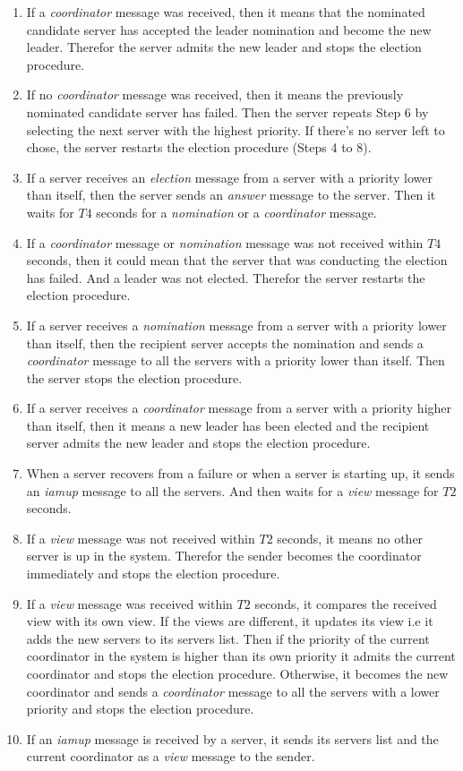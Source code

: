 \documentclass[dareport.tex]{subfiles}
\begin{document}
\begin{enumerate}[leftmargin=*]
	\item If a \emph{coordinator} message was received, then it means that the nominated candidate server has accepted the leader nomination and become the new leader. Therefor the server admits the new leader and stops the election procedure.
	\item If no \emph{coordinator} message was received, then it means the previously nominated candidate server has failed. Then the server repeats Step 6 by selecting the next server with the highest priority. If there's no server left to chose, the server restarts the election procedure (Steps 4 to 8).
	\item If a server receives an \emph{election} message from a server with a priority lower than itself, then the server sends an \emph{answer} message to the server. Then it waits for $ T4 $ seconds for a \emph{nomination} or a \emph{coordinator} message.
	\item If a \emph{coordinator} message or \emph{nomination} message was not received within $ T4 $ seconds, then it could mean that the server that was conducting the election has failed. And a leader was not elected. Therefor the server restarts the election procedure.
	\item If a server receives a \emph{nomination} message from a server with a priority lower than itself, then the recipient server accepts the nomination and sends a \emph{coordinator} message to all the servers with a priority lower than itself. Then the server stops the election procedure.
	\item If a server receives a \emph{coordinator} message from a server with a priority higher than itself, then it means a new leader has been elected and the recipient server admits the new leader and stops the election procedure.
	\item When a server recovers from a failure or when a server is starting up, it sends an \emph{iamup} message to all the servers. And then waits for a \emph{view} message for $ T2 $ seconds.
	\item If a \emph{view} message was not received within $ T2 $ seconds, it means no other server is up in the system. Therefor the sender becomes the coordinator immediately and stops the election procedure.
	\item If a \emph{view} message was received within $ T2 $ seconds, it compares the received view with its own view. If the views are different, it updates its view i.e it adds the new servers to its servers list. Then if the priority of the current coordinator in the system is higher than its own priority it admits the current coordinator and stops the election procedure. Otherwise, it becomes the new coordinator and sends a \emph{coordinator} message to all the servers with a lower priority and stops the election procedure.
	\item If an \emph{iamup} message is received by a server, it sends its servers list and the current coordinator as a \emph{view} message to the sender.
\end{enumerate}
\end{document}
